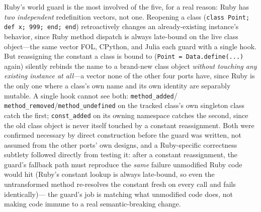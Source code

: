 \documentclass[sigplan,screen,review,anonymous]{acmart}
\begin{document}
Ruby's world guard is the most involved of the five, for a real
reason: Ruby has \emph{two independent} redefinition vectors, not one.
Reopening a class (\texttt{class Point; def x; 999; end; end})
retroactively changes an already-existing instance's behavior, since
Ruby method dispatch is always late-bound on the live class
object---the same vector FOL, CPython, and Julia each guard with a
single hook. But reassigning the constant a class is bound to
(\texttt{Point = Data.define(...)} again) silently rebinds the name to
a brand-new class object \emph{without touching any existing instance
at all}---a vector none of the other four ports have, since Ruby is the
only one where a class's own name and its own identity are separably
mutable. A single hook cannot see both: \texttt{method\_added}/
\texttt{method\_removed}/\texttt{method\_undefined} on the tracked
class's own singleton class catch the first; \texttt{const\_added} on
its owning namespace catches the second, since the old class object is
never itself touched by a constant reassignment. Both were confirmed
necessary by direct construction before the guard was written, not
assumed from the other ports' own designs, and a Ruby-specific
correctness subtlety followed directly from testing it: after a
constant reassignment, the guard's fallback path must reproduce the
\emph{same} failure unmodified Ruby code would hit (Ruby's constant
lookup is always late-bound, so even the untransformed method
re-resolves the constant fresh on every call and fails identically)---
the guard's job is matching what unmodified code does, not making code
immune to a real semantic-breaking change.
\end{document}
